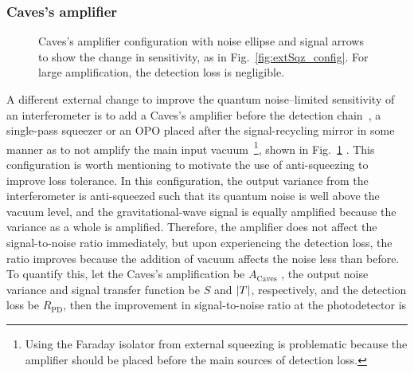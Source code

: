 \subsubsection{Caves's amplifier}
\label{sec:cavess_amp}

\begin{figure}
	\centering
	\caption{Caves's amplifier configuration with noise ellipse and signal arrows to show the change in sensitivity, as in Fig.~\ref{fig:extSqz_config}. For large amplification, the detection loss is negligible.}
	\label{fig:Cavess_amplifier}
\end{figure}

A different external change to improve the quantum noise--limited sensitivity of an interferometer is to add a Caves's amplifier before the detection chain~\cite{}, a single-pass squeezer or an OPO  placed after the signal-recycling mirror in some manner as to not amplify the main input vacuum~\footnote{Using the Faraday isolator from external squeezing is problematic because the amplifier should be placed before the main sources of detection loss.}, shown in Fig.~\ref{fig:Cavess_amplifier} . This configuration is worth mentioning %
to motivate the use of anti-squeezing to improve loss tolerance. 
In this configuration, the output variance from the interferometer is anti-squeezed such that its quantum noise is well above  the vacuum level, and the gravitational-wave signal is equally amplified because the variance as a whole is amplified. %
Therefore, the amplifier does not affect the signal-to-noise ratio immediately, but upon experiencing the detection loss, the ratio improves because the addition of vacuum affects the noise less than before. 
To quantify this, let the Caves's amplification be $A_\text{Caves}$ , the output noise variance and signal transfer function be $S$ and $\abs{T}$, respectively, and the detection loss be $R_\text{PD}$, then the improvement in signal-to-noise ratio at the photodetector is
